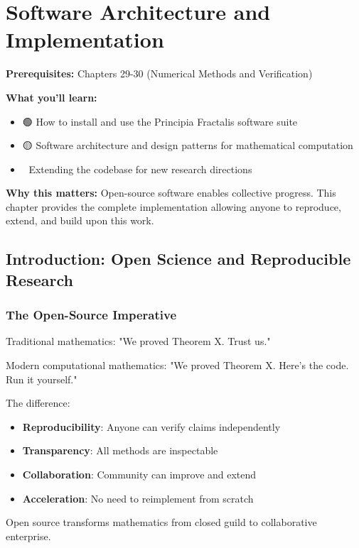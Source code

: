 \chapter{Software Architecture and Implementation}
\label{ch:software}

\begin{chapterobjectives}
\textbf{Prerequisites:} Chapters 29-30 (Numerical Methods and Verification)

\textbf{What you'll learn:}
\begin{itemize}
\item 🟢 How to install and use the Principia Fractalis software suite
\item 🟡 Software architecture and design patterns for mathematical computation
\item 🔴 Extending the codebase for new research directions
\end{itemize}

\textbf{Why this matters:} Open-source software enables collective progress. This chapter provides the complete implementation allowing anyone to reproduce, extend, and build upon this work.
\end{chapterobjectives}

\section{Introduction: Open Science and Reproducible Research}
\label{sec:open-science}

\subsection{The Open-Source Imperative}

\begin{intuitive}
Traditional mathematics: "We proved Theorem X. Trust us."

Modern computational mathematics: "We proved Theorem X. Here's the code. Run it yourself."

The difference:
\begin{itemize}
\item \textbf{Reproducibility}: Anyone can verify claims independently
\item \textbf{Transparency}: All methods are inspectable
\item \textbf{Collaboration}: Community can improve and extend
\item \textbf{Acceleration}: No need to reimplement from scratch
\end{itemize}

Open source transforms mathematics from closed guild to collaborative enterprise.
\end{intuitive}

